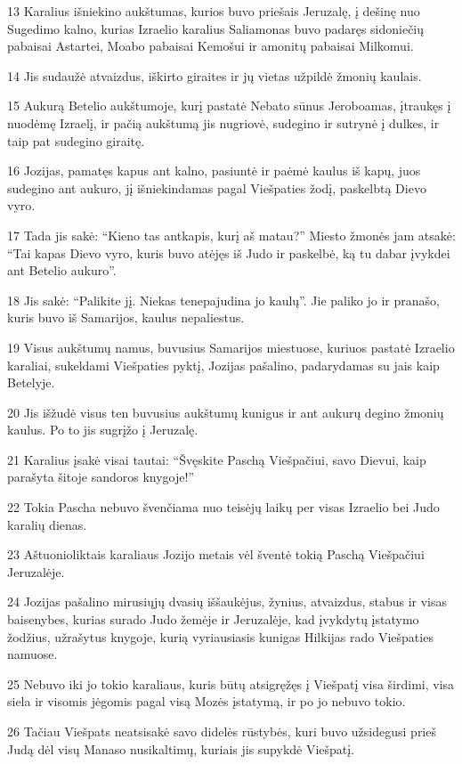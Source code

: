 \par 13 Karalius išniekino aukštumas, kurios buvo priešais Jeruzalę, į dešinę nuo Sugedimo kalno, kurias Izraelio karalius Saliamonas buvo padaręs sidoniečių pabaisai Astartei, Moabo pabaisai Kemošui ir amonitų pabaisai Milkomui. 
\par 14 Jis sudaužė atvaizdus, iškirto giraites ir jų vietas užpildė žmonių kaulais. 
\par 15 Aukurą Betelio aukštumoje, kurį pastatė Nebato sūnus Jeroboamas, įtraukęs į nuodėmę Izraelį, ir pačią aukštumą jis nugriovė, sudegino ir sutrynė į dulkes, ir taip pat sudegino giraitę. 
\par 16 Jozijas, pamatęs kapus ant kalno, pasiuntė ir paėmė kaulus iš kapų, juos sudegino ant aukuro, jį išniekindamas pagal Viešpaties žodį, paskelbtą Dievo vyro. 
\par 17 Tada jis sakė: “Kieno tas antkapis, kurį aš matau?” Miesto žmonės jam atsakė: “Tai kapas Dievo vyro, kuris buvo atėjęs iš Judo ir paskelbė, ką tu dabar įvykdei ant Betelio aukuro”. 
\par 18 Jis sakė: “Palikite jį. Niekas tenepajudina jo kaulų”. Jie paliko jo ir pranašo, kuris buvo iš Samarijos, kaulus nepaliestus. 
\par 19 Visus aukštumų namus, buvusius Samarijos miestuose, kuriuos pastatė Izraelio karaliai, sukeldami Viešpaties pyktį, Jozijas pašalino, padarydamas su jais kaip Betelyje. 
\par 20 Jis išžudė visus ten buvusius aukštumų kunigus ir ant aukurų degino žmonių kaulus. Po to jis sugrįžo į Jeruzalę. 
\par 21 Karalius įsakė visai tautai: “Švęskite Paschą Viešpačiui, savo Dievui, kaip parašyta šitoje sandoros knygoje!” 
\par 22 Tokia Pascha nebuvo švenčiama nuo teisėjų laikų per visas Izraelio bei Judo karalių dienas. 
\par 23 Aštuonioliktais karaliaus Jozijo metais vėl šventė tokią Paschą Viešpačiui Jeruzalėje. 
\par 24 Jozijas pašalino mirusiųjų dvasių iššaukėjus, žynius, atvaizdus, stabus ir visas baisenybes, kurias surado Judo žemėje ir Jeruzalėje, kad įvykdytų įstatymo žodžius, užrašytus knygoje, kurią vyriausiasis kunigas Hilkijas rado Viešpaties namuose. 
\par 25 Nebuvo iki jo tokio karaliaus, kuris būtų atsigręžęs į Viešpatį visa širdimi, visa siela ir visomis jėgomis pagal visą Mozės įstatymą, ir po jo nebuvo tokio. 
\par 26 Tačiau Viešpats neatsisakė savo didelės rūstybės, kuri buvo užsidegusi prieš Judą dėl visų Manaso nusikaltimų, kuriais jis supykdė Viešpatį. 
